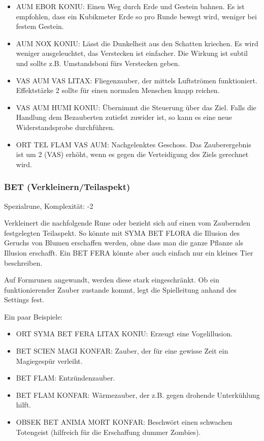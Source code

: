 \documentclass{article}
\begin{document}
\begin{itemize}
\item AUM EBOR KONIU: Einen Weg durch Erde und Gestein bahnen. Es ist empfohlen, dass ein Kubikmeter Erde so pro Runde bewegt wird, weniger bei festem Gestein.
\item AUM NOX KONIU: Lässt die Dunkelheit aus den Schatten kriechen. Es wird weniger ausgeleuchtet, das Verstecken ist einfacher. Die Wirkung ist subtil und sollte z.B. Umstandsboni fürs Verstecken geben.
\item VAS AUM VAS LITAX: Fliegenzauber, der mittels Luftströmen funktioniert. Effektstärke 2 sollte für einen normalen Menschen knapp reichen.
\item VAS AUM HUMI KONIU: Übernimmt die Steuerung über das Ziel. Falls die Handlung dem Bezauberten zutiefst zuwider ist, so kann es eine neue Widerstandsprobe durchführen.
\item ORT TEL FLAM VAS AUM: Nachgelenktes Geschoss. Das Zauberergebnis ist um 2 (VAS) erhöht, wenn es gegen die Verteidigung des Ziels gerechnet wird.
\end{itemize}

\subsubsection{BET (Verkleinern/Teilaspekt)}

Spezialrune, Komplexität: -2

Verkleinert die nachfolgende Rune oder bezieht sich auf einen vom Zaubernden festgelegten Teilaspekt. So könnte mit
SYMA BET FLORA die Illusion des Geruchs von Blumen erschaffen werden, ohne dass man die ganze Pflanze als Illusion
erschafft. Ein BET FERA könnte aber auch einfach nur ein kleines Tier beschreiben.

Auf Formrunen angewandt, werden diese stark eingeschränkt. Ob ein funktionierender Zauber zustande kommt, legt die
Spielleitung anhand des Settings fest.

Ein paar Beispiele:

\begin{itemize}
\item ORT SYMA BET FERA LITAX KONIU: Erzeugt eine Vogelillusion.
\item BET SCIEN MAGI KONFAR: Zauber, der für eine gewisse Zeit ein Magiegespür verleiht.
\item BET FLAM: Entzündenzauber.
\item BET FLAM KONFAR: Wärmezauber, der z.B. gegen drohende Unterkühlung hilft.
\item OBSEK BET ANIMA MORT KONFAR: Beschwört einen schwachen Totengeist (hilfreich für die Erschaffung dummer Zombies).
\end{itemize}
\end{document}
